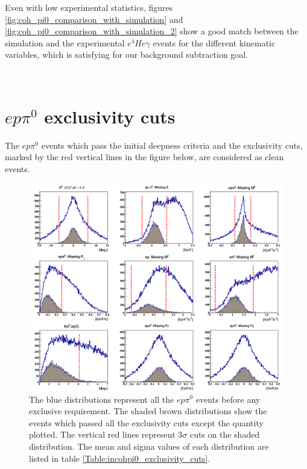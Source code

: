 Even with low experimental statistics, figures \ref{fig:coh_pi0_comparison_with_simulation} and \ref{fig:coh_pi0_comparison_with_simulation_2} show a good match between the simulation and the experimental   $e^{4}He\gamma$ events for the different kinematic variables, which is satisfying  for our background subtraction goal. 


~\newpage
~\newpage
\section{$ep\pi^{0}$ exclusivity cuts}
The $ep\pi^{0}$ events which pass the initial deepness criteria and the exclusivity cuts, marked by the red vertical lines in the figure below, are considered as clean events.

\begin{figure}[h!]
\centering
\includegraphics[scale=0.4]{fig_dvcs/all_incoh_pi0_exc_cuts.png}
\caption{The blue distributions represent all the $ep\pi^{0}$ events before any exclusive requirement. The shaded brown distributions show the events which passed all the exclusivity cuts except the quantity plotted. The vertical red lines represent $3\sigma$ cuts on the shaded distribution. The mean and sigma values of each distribution are listed in table \ref{Table:incohpi0_exclusivity_cuts}.} 
\label{fig:incohpi0_exclusivty_cuts}
\end{figure}



